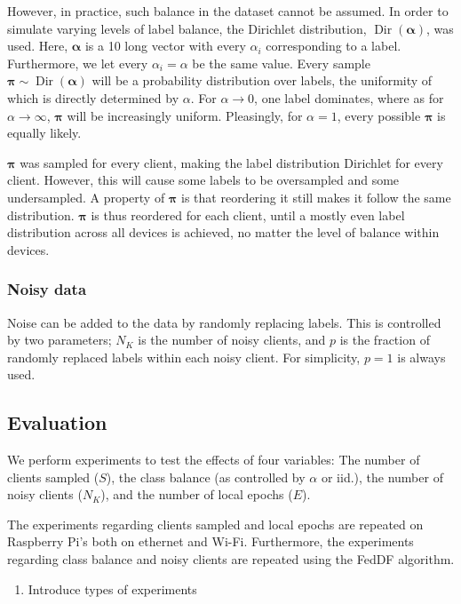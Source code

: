 \documentclass{article}
\begin{document}
However, in practice, such balance in the dataset cannot be assumed.
In order to simulate varying levels of label balance, the Dirichlet distribution, $\operatorname{Dir}(\bm\alpha)$, was used.
Here, $\bm\alpha$ is a 10 long vector with every $\alpha_i$ corresponding to a label.
Furthermore, we let every $\alpha_i=\alpha$ be the same value.
Every sample $\bm\pi\sim\operatorname{Dir}(\bm\alpha)$ will be a probability distribution over labels, the uniformity of which is directly determined by $\alpha$.
For $\alpha\to0$, one label dominates, where as for $\alpha\to\infty$, $\bm\pi$ will be increasingly uniform.
Pleasingly, for $\alpha=1$, every possible $\bm\pi$ is equally likely.

$\bm\pi$ was sampled for every client, making the label distribution Dirichlet for every client.
However, this will cause some labels to be oversampled and some undersampled.
A property of $\bm\pi$ is that reordering it still makes it follow the same distribution.
$\bm\pi$ is thus reordered for each client, until a mostly even label distribution across all devices is achieved, no matter the level of balance within devices.

\subsubsection{Noisy data}
Noise can be added to the data by randomly replacing labels.
This is controlled by two parameters; $N_K$ is the number of noisy clients, and $p$ is the fraction of randomly replaced labels within each noisy client.
For simplicity, $p=1$ is always used.

\subsection{Evaluation}
We perform experiments to test the effects of four variables: The number of clients sampled ($S$), the class balance (as controlled by $\alpha$ or iid.), the number of noisy clients ($N_K$), and the number of local epochs ($E$).

The experiments regarding clients sampled and local epochs are repeated on Raspberry Pi's both on ethernet and Wi-Fi.
Furthermore, the experiments regarding class balance and noisy clients are repeated using the FedDF algorithm.

\begin{enumerate}
    \item Introduce types of experiments
\end{enumerate}
\end{document}
